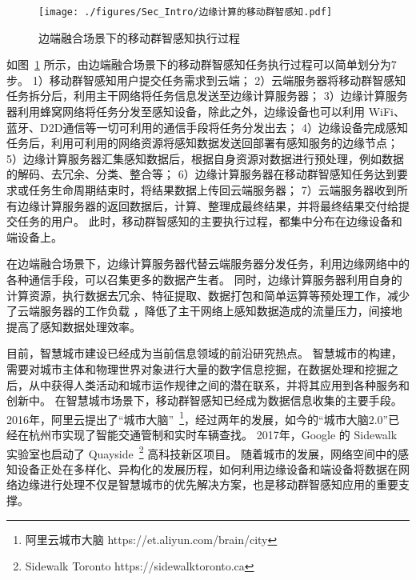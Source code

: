 \begin{figure}[!ht]
  \centering
  \vspace{-1em}
  \texttt{[image: ./figures/Sec\_Intro/边缘计算的移动群智感知.pdf]}
  \vspace{-0.5em}
  \caption{边端融合场景下的移动群智感知执行过程}
  \vspace{-1em}
  \label{Figure_MCS_with_EC}
\end{figure}

如图~\ref{Figure_MCS_with_EC} 所示，由边端融合场景下的移动群智感知任务执行过程可以简单划分为7步。
1）移动群智感知用户提交任务需求到云端；
2）云端服务器将移动群智感知任务拆分后，利用主干网络将任务信息发送至边缘计算服务器；
3）边缘计算服务器利用蜂窝网络将任务分发至感知设备，除此之外，边缘设备也可以利用 WiFi、蓝牙、D2D通信等一切可利用的通信手段将任务分发出去；
4）边缘设备完成感知任务后，利用可利用的网络资源将感知数据发送回部署有感知服务的边缘节点；
5）边缘计算服务器汇集感知数据后，根据自身资源对数据进行预处理，例如数据的解码、去冗余、分类、整合等；
6）边缘计算服务器在移动群智感知任务达到要求或任务生命周期结束时，将结果数据上传回云端服务器；
7）云端服务器收到所有边缘计算服务器的返回数据后，计算、整理成最终结果，并将最终结果交付给提交任务的用户。
此时，移动群智感知的主要执行过程，都集中分布在边缘设备和端设备上。

在边端融合场景下，边缘计算服务器代替云端服务器分发任务，利用边缘网络中的各种通信手段，可以召集更多的数据产生者。
同时，边缘计算服务器利用自身的计算资源，执行数据去冗余、特征提取、数据打包和简单运算等预处理工作，减少了云端服务器的工作负载 ，降低了主干网络上感知数据造成的流量压力，间接地提高了感知数据处理效率。


目前，智慧城市建设已经成为当前信息领域的前沿研究热点。
智慧城市的构建，需要对城市主体和物理世界对象进行大量的数字信息挖掘，在数据处理和挖掘之后，从中获得人类活动和城市运作规律之间的潜在联系，并将其应用到各种服务和创新中。
在智慧城市场景下，移动群智感知已经成为数据信息收集的主要手段。
2016年，阿里云提出了“城市大脑”~\footnote{阿里云城市大脑 https://et.aliyun.com/brain/city}，经过两年的发展，如今的“城市大脑2.0”已经在杭州市实现了智能交通管制和实时车辆查找。
2017年，Google 的 Sidewalk 实验室也启动了 Quayside~\footnote{Sidewalk Toronto https://sidewalktoronto.ca} 高科技新区项目。
随着城市的发展，网络空间中的感知设备正处在多样化、异构化的发展历程，如何利用边缘设备和端设备将数据在网络边缘进行处理不仅是智慧城市的优先解决方案，也是移动群智感知应用的重要支撑。

